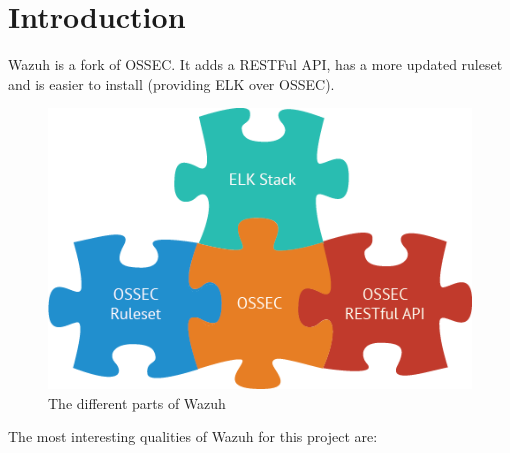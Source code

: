 
\section{Introduction}
Wazuh is a fork of OSSEC. It adds a RESTFul API, has a more updated ruleset and is easier to install (providing ELK over OSSEC).
\begin{figure}[H]
  \centering
	\includegraphics[width=.6\textwidth]{figuras/wazuh_stack.png}
	\caption{The different parts of Wazuh\cite{wazuh_stack}}
\end{figure}
\linej
The most interesting qualities of Wazuh for this project are\cite{wazuh_index}\cite{wazuh_documentation}: %
